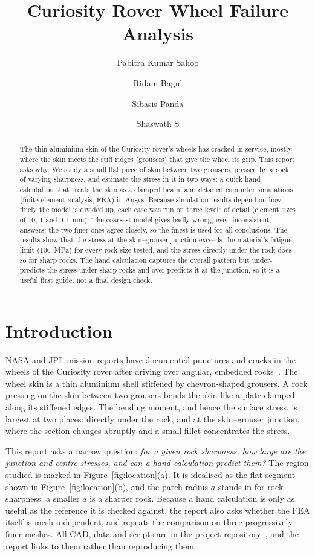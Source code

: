 \documentclass[10pt,a4paper]{article}
\title{Curiosity Rover Wheel Failure Analysis}
\author{Pabitra Kumar Sahoo \and Ridam Bagul \and Sibasis Panda \and Shaswath S}
\date{}
\begin{document}
\maketitle

\begin{abstract}
\noindent The thin aluminium skin of the Curiosity rover's wheels has cracked in service, mostly where the skin meets the stiff ridges (grousers) that give the wheel its grip. This report asks why. We study a small flat piece of skin between two grousers, pressed by a rock of varying sharpness, and estimate the stress in it in two ways: a quick hand calculation that treats the skin as a clamped beam, and detailed computer simulations (finite element analysis, FEA) in Ansys. Because simulation results depend on how finely the model is divided up, each case was run on three levels of detail (element sizes of 10, 1 and \SI{0.1}{mm}). The coarsest model gives badly wrong, even inconsistent, answers; the two finer ones agree closely, so the finest is used for all conclusions. The results show that the stress at the skin--grouser junction exceeds the material's fatigue limit (\SI{106}{MPa}) for every rock size tested, and the stress directly under the rock does so for sharp rocks. The hand calculation captures the overall pattern but under-predicts the stress under sharp rocks and over-predicts it at the junction, so it is a useful first guide, not a final design check.
\end{abstract}

\section{Introduction}

NASA and JPL mission reports have documented punctures and cracks in the wheels of the Curiosity rover after driving over angular, embedded rocks~\cite{nasa}. The wheel skin is a thin aluminium shell stiffened by chevron-shaped grousers. A rock pressing on the skin between two grousers bends the skin like a plate clamped along its stiffened edges. The bending moment, and hence the surface stress, is largest at two places: directly under the rock, and at the skin--grouser junction, where the section changes abruptly and a small fillet concentrates the stress.

This report asks a narrow question: \emph{for a given rock sharpness, how large are the junction and centre stresses, and can a hand calculation predict them?} The region studied is marked in Figure~\ref{fig:location}(a). It is idealised as the flat segment shown in Figure~\ref{fig:location}(b), and the patch radius $a$ stands in for rock sharpness: a smaller $a$ is a sharper rock. Because a hand calculation is only as useful as the reference it is checked against, the report also asks whether the FEA itself is mesh-independent, and repeats the comparison on three progressively finer meshes. All CAD, data and scripts are in the project repository~\cite{repo}, and the report links to them rather than reproducing them.
\end{document}
